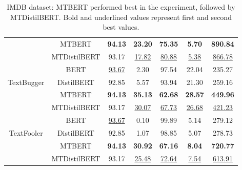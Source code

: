 \documentclass[%
	BCOR=8mm, %
	DIV=12,
	toc=bibliography, %
	toc=listof, %
	oneside, %
	egregdoesnotlikesansseriftitles, %
	]{scrbook}
\begin{document}
\begin{table}[H]
{\begin{tabular}{|c|c|c|c|c|c|c|}
                     & MTBERT &              \textbf{94.13}&                   \textbf{23.20} &                 \textbf{75.35} &                      \textbf{5.70} &          \textbf{890.84} \\
                     & MTDistilBERT &                93.17 &                   \underline{17.82} &                  \underline{80.88} &                     \underline{5.38} &           \underline{866.78} \\
                \midrule
                     & BERT &               		\underline{93.67} &                     2.30 &                  97.54 &                     22.04 &           235.27 \\
 TextBugger & DistilBERT &                92.85 &                     5.57 &                  93.94 &                     21.30 &           259.16 \\
                     & MTBERT &                \textbf{94.13} &                    \textbf{35.13} &                 \textbf{62.68} &                     \textbf{28.57} &           \textbf{449.96} \\
                     & MTDistilBERT &          93.17 &                   \underline{30.07} &                  \underline{67.73} &                     \underline{26.68} &           \underline{421.23} \\
                \midrule
                    & BERT &                		\underline{93.67} &                     0.10 &                  99.89 &                      5.14 &           279.12 \\
  TextFooler & DistilBERT &                92.85 &                     1.07 &                  98.85 &                      5.07 &           278.73 \\
                    & MTBERT &                \textbf{94.13} &          \textbf{30.92}&     \textbf{67.16} &        \textbf{8.04} &   \textbf{720.77} \\
                    & MTDistilBERT  &          93.17 &                    \underline{25.48} &                  \underline{72.64} &                     \underline{7.54} &           \underline{613.91} \\
                    \bottomrule
 \end{tabular}
    }
    \caption[Experiment result of IMDB dataset]{IMDB dataset: MTBERT performed best in the experiment, followed by MTDistilBERT. Bold and underlined values represent first and second best values.}
    \label{table:IMDBExpRes}
\end{table}
\end{document}
